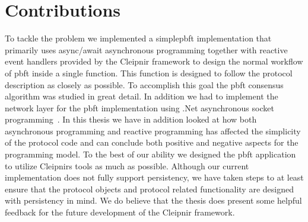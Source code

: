 \section{Contributions}

To tackle the problem we implemented a simple\ac{pbft} implementation that primarily uses async/await asynchronous programming together with reactive event handlers provided by the Cleipnir framework to design the normal workflow of \ac{pbft} inside a single function. This function is designed to follow the protocol description as closely as possible. To accomplish this goal the \ac{pbft} consensus algorithm was studied in great detail. In addition we had to implement the network layer for the \ac{pbft} implementation using .Net asynchronous socket programming~\cite{DOC:AsyncSocketProg, VIDEO:dotnetsocketprog}. In this thesis we have in addition looked at how both asynchronous programming and reactive programming has affected the simplicity of the protocol code and can conclude both positive and negative aspects for the programming model. To the best of our ability we designed the \ac{pbft} application to utilize Cleipnirs tools as much as possible. Although our current implementation does not fully support persistency, we have taken steps to at least ensure that the protocol objects and protocol related functionality are designed with persistency in mind. We do believe that the thesis does present some helpful feedback for the future development of the Cleipnir framework.

